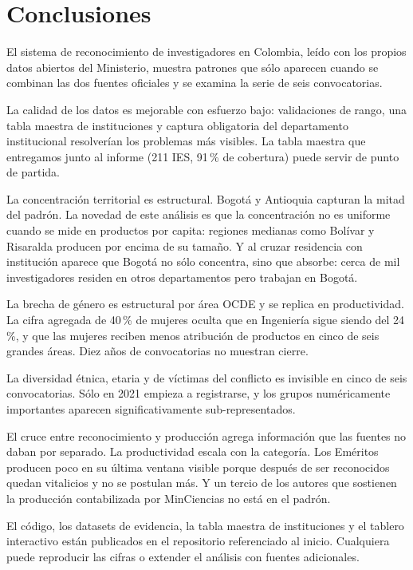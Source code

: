 \documentclass[11pt,a4paper,oneside]{article}
\begin{document}
\section{Conclusiones}\label{sec:conclusiones}

El sistema de reconocimiento de investigadores en Colombia, leído con los propios datos abiertos del Ministerio, muestra patrones que sólo aparecen cuando se combinan las dos fuentes oficiales y se examina la serie de seis convocatorias.

La calidad de los datos es mejorable con esfuerzo bajo: validaciones de rango, una tabla maestra de instituciones y captura obligatoria del departamento institucional resolverían los problemas más visibles. La tabla maestra que entregamos junto al informe (211 IES, 91\,\% de cobertura) puede servir de punto de partida.

La concentración territorial es estructural. Bogotá y Antioquia capturan la mitad del padrón. La novedad de este análisis es que la concentración no es uniforme cuando se mide en productos por capita: regiones medianas como Bolívar y Risaralda producen por encima de su tamaño. Y al cruzar residencia con institución aparece que Bogotá no sólo concentra, sino que absorbe: cerca de mil investigadores residen en otros departamentos pero trabajan en Bogotá.

La brecha de género es estructural por área OCDE y se replica en productividad. La cifra agregada de 40\,\% de mujeres oculta que en Ingeniería sigue siendo del 24\,\%, y que las mujeres reciben menos atribución de productos en cinco de seis grandes áreas. Diez años de convocatorias no muestran cierre.

La diversidad étnica, etaria y de víctimas del conflicto es invisible en cinco de seis convocatorias. Sólo en 2021 empieza a registrarse, y los grupos numéricamente importantes aparecen significativamente sub-representados.

El cruce entre reconocimiento y producción agrega información que las fuentes no daban por separado. La productividad escala con la categoría. Los Eméritos producen poco en su última ventana visible porque después de ser reconocidos quedan vitalicios y no se postulan más. Y un tercio de los autores que sostienen la producción contabilizada por MinCiencias no está en el padrón.

El código, los datasets de evidencia, la tabla maestra de instituciones y el tablero interactivo están publicados en el repositorio referenciado al inicio. Cualquiera puede reproducir las cifras o extender el análisis con fuentes adicionales.
\end{document}
